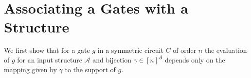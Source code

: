 \documentclass[../main/thesis.tex]{subfiles}
\begin{document}





\section {Associating a Gates with a Structure}
\label{sec:evaluating-circuits}
We first show that for a gate $g$ in a symmetric circuit $C$ of order $n$ the
evaluation of $g$ for an input structure $\mathcal{A}$ and bijection $\gamma \in
[n]^{\underline{A}}$ depends only on the mapping given by $\gamma$ to the
support of $g$.
\end{document}
